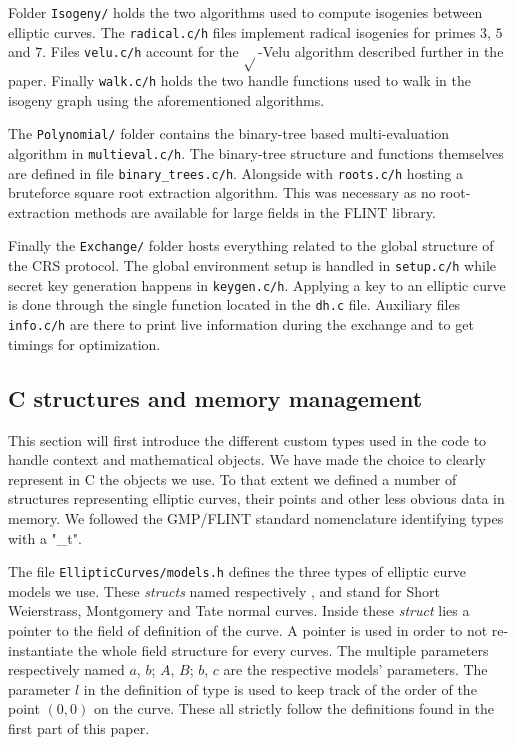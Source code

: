 \documentclass[../main.tex]{subfiles}
\begin{document}
Folder \texttt{Isogeny/} holds the two algorithms used to compute isogenies between elliptic curves.
The \texttt{radical.c/h} files implement radical isogenies for primes $3$, $5$ and $7$.
Files \texttt{velu.c/h} account for the $\sqrt{}$-Velu algorithm described further in the paper.
Finally \texttt{walk.c/h} holds the two handle functions used to walk in the isogeny graph using the aforementioned algorithms.

The \texttt{Polynomial/} folder contains the binary-tree based multi-evaluation algorithm in \texttt{multieval.c/h}.
The binary-tree structure and functions themselves are defined in file \texttt{binary\_trees.c/h}.
Alongside with \texttt{roots.c/h} hosting a bruteforce square root extraction algorithm.
This was necessary as no root-extraction methods are available for large fields in the FLINT library.

Finally the \texttt{Exchange/} folder hosts everything related to the global structure of the CRS protocol.
The global environment setup is handled in \texttt{setup.c/h} while secret key generation happens in \texttt{keygen.c/h}.
Applying a key to an elliptic curve is done through the single function located in the \texttt{dh.c} file.
Auxiliary files \texttt{info.c/h} are there to print live information during the exchange  and to get timings for optimization.


\subsection{C structures and memory management}
This section will first introduce the different custom types used in the code to handle context and mathematical objects.
We have made the choice to clearly represent in C the objects we use.
To that extent we defined a number of structures representing elliptic curves, their points and other less obvious data in memory.
We followed the GMP/FLINT standard nomenclature identifying types with a "\_t".

The file \texttt{EllipticCurves/models.h} defines the three types of elliptic curve models we use.
These \textit{structs} named respectively ,  and  stand for Short Weierstrass, Montgomery and Tate normal curves.
Inside these \textit{struct} lies a  pointer to the field of definition of the curve.
A pointer is used in order to not re-instantiate the whole field structure for every curves.
The multiple  parameters respectively named $a$, $b$; $A$, $B$; $b$, $c$ are the respective models' parameters.
The  parameter $l$ in the definition of type  is used to keep track of the order of the point $(0, 0)$ on the curve.
These all strictly follow the definitions found in the first part of this paper.
\end{document}
